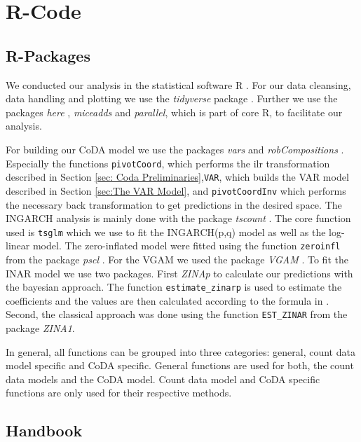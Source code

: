 \section{R-Code}
\label{sec:R-Code}

\subsection{R-Packages}
\label{sec:R-Packages}

We conducted our analysis in the statistical software R \textcite{R:2022}. For our data cleansing, data handling and plotting we use the \textit{tidyverse} package \textcite{Tidyverse:2019}. Further we use the packages \textit{here} \textcite{here:2020}, \textit{miceadds} \textcite{Miceadds:2023} and \textit{parallel}, which is part of core R, to facilitate our analysis.  

For building our CoDA model we use the packages \textit{vars} \textcite{VAR:2008,CoDAR2:2008} and \textit{robCompositions} \textcite{RobComp:2011,CoDAR4:2018}. Especially the functions \texttt{pivotCoord}, which performs the ilr transformation described in Section \ref{sec: Coda Preliminaries},\texttt{VAR}, which builds the VAR model described in Section \ref{sec:The VAR Model}, and \texttt{pivotCoordInv} which performs the necessary back transformation to get predictions in the desired space. The INGARCH analysis is mainly done with the package \textit{tscount} \textcite{Tscount:2017,Tscount:2020}. The core function used is \texttt{tsglm} which we use to fit the INGARCH(p,q) model as well as the log-linear model. The zero-inflated model were fitted using the function \texttt{zeroinfl} from the package \textit{pscl} \textcite{Pscl:2008}. For the VGAM we used the package \textit{VGAM} \textcite{RVGAM:2010}. To fit the INAR model we use two packages. First \textit{ZINAp} to calculate our predictions with the bayesian approach. The function \texttt{estimate\_zinarp} is used to estimate the coefficients and the values are then calculated according to the formula in \textcite{Silva:2009}. Second, the classical approach was done using the function \texttt{EST\_ZINAR} from the package \textit{ZINA1}.

In general, all functions can be grouped into three categories: general, count data model specific and CoDA specific. General functions are used for both, the count data models and the CoDA model. Count data model and CoDA specific functions are only used for their respective methods.
\subsection{Handbook}
\label{sec:Handbook}

